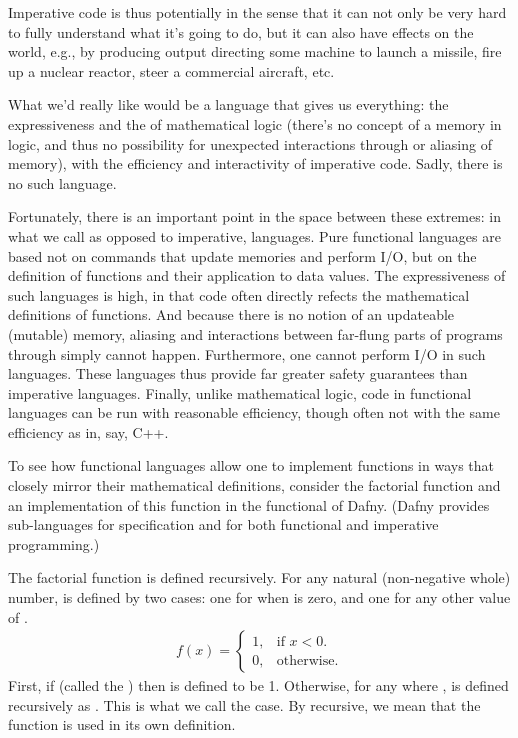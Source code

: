 \documentclass[letterpaper,10pt,english]{sphinxmanual}
\begin{document}
Imperative code is thus potentially  in the sense that it can
not only be very hard to fully understand what it’s going to do, but
it can also have effects on the world, e.g., by producing output
directing some machine to launch a missile, fire up a nuclear reactor,
steer a commercial aircraft, etc.

What we’d really like would be a language that gives us everything:
the expressiveness and the  of mathematical logic (there’s no
concept of a memory in logic, and thus no possibility for unexpected
interactions through or aliasing of memory), with the efficiency and
interactivity of imperative code. Sadly, there is no such language.

Fortunately, there is an important point in the space between these
extremes: in what we call  as opposed to imperative,
 languages. Pure functional languages are based not on
commands that update memories and perform I/O, but on the definition
of functions and their application to data values. The expressiveness
of such languages is high, in that code often directly refects the
mathematical definitions of functions. And because there is no notion
of an updateable (mutable) memory, aliasing and interactions between
far-flung parts of programs through  simply cannot
happen. Furthermore, one cannot perform I/O in such languages. These
languages thus provide far greater safety guarantees than imperative
languages.  Finally, unlike mathematical logic, code in functional
languages can be run with reasonable efficiency, though often not with
the same efficiency as in, say, C++.

To see how functional languages allow one to implement functions in
ways that closely mirror their mathematical definitions, consider the
factorial function and an implementation of this function in the
functional  of Dafny. (Dafny provides sub-languages for
specification and for both functional and imperative programming.)

The factorial function is defined recursively. For any natural
(non-negative whole) number,  is defined by two
cases: one for when  is zero, and one for any other value of
.
\begin{equation*}
\begin{split}f(x)= \begin{cases} 1, & \text{if $x<0$}.\\ 0, & \text{otherwise}.\end{cases}\end{split}
\end{equation*}
First, if  (called the ) then  is
defined to be 1. Otherwise, for any  where , 
is defined recursively as . This is what we call
the  case. By recursive, we mean that the function is used
in its own definition.
\end{document}
